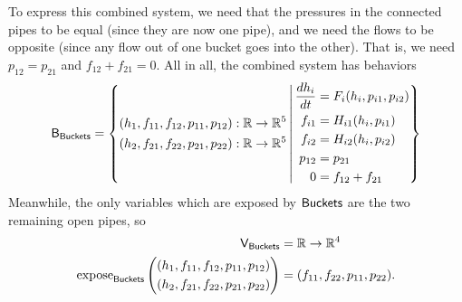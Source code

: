 \documentclass[DynamicalBook]{subfiles}
\begin{document}
To express this combined system, we need that the pressures in the connected
pipes to be equal (since they are now one pipe), and we need the flows to be opposite (since any flow out of one
bucket goes into the other). That is, we need $p_{12} = p_{21}$ and $f_{12} +
f_{21} = 0$. All in all, the combined system has behaviors
\begin{equation}\label{eqn:combined.bucket.system}
  \mathsf{B}_{\mathsf{Buckets}} = \left\{ \begin{aligned}
      (h_1, f_{11}, f_{12}, p_{11}, p_{12}) &: \mathbb{R} \to \mathbb{R}^5\\
      (h_2, f_{21}, f_{22}, p_{21}, p_{22}) &: \mathbb{R} \to \mathbb{R}^5\\
    \end{aligned}\,\middle|\,
\begin{aligned}
  \frac{dh_i}{dt} &= F_i(h_i, p_{i1}, p_{i2}) \\
  f_{i1} &= H_{i1}(h_i, p_{i1})\\
  f_{i2} &= H_{i2}(h_i, p_{i2})\\ 
  p_{12} &= p_{21} \\
  0 &= f_{12} + f_{21}
\end{aligned}
  \right\}
  \end{equation}
Meanwhile, the only variables which are exposed by $\mathsf{Buckets}$ are the two
remaining open pipes, so
\begin{align*}
  \mathsf{V}_{\mathsf{Buckets}} &= \mathbb{R} \to \mathbb{R}^4 \\
  \mathrm{expose}_{\mathsf{Buckets}}\left(\begin{aligned}
      (h_1, f_{11}, f_{12}, p_{11}, p_{12}) \\
      (h_2, f_{21}, f_{22}, p_{21}, p_{22})\\
    \end{aligned}  \right) &= (f_{11}, f_{22}, p_{11}, p_{22}).
\end{align*}
\end{document}
